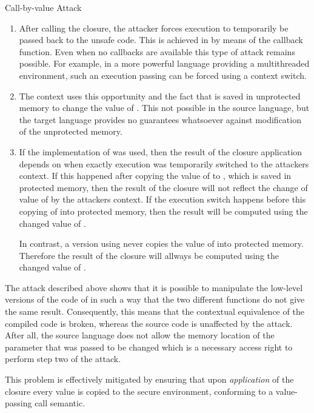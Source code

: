 \documentclass[10pt,a4paper,master=cws, masteroption=ai,english,inputenc=utf8]{kulemt}
\begin{document}
\begin{attack}{Call-by-value Attack}
\begin{enumerate}
\item After calling the closure, the attacker forces execution to temporarily be passed back to the unsafe code.
This is achieved in  by means of the callback function. 
Even when no callbacks are available this type of attack remains possible. For example, in a more powerful language providing a multithreaded environment, such an execution passing can be forced using a context switch.
\item The context uses this opportunity and the fact that  is saved in unprotected memory to change the value of . This not possible in the source language, but the target language provides no guarantees whatsoever against modification of the unprotected memory.
\item If the implementation of  was used, then the result of the closure application depends on when exactly execution was temporarily switched to the attackers context.
If this happened after copying the value of  to , which is saved in protected memory, then the result of the closure will not reflect the change of value of  by the attackers context.
If the execution switch happens before this copying of  into protected memory, then the result will be computed using the changed value of .

In contrast, a version using   never copies the value of  into protected memory. 
Therefore the result of the closure will allways be computed using the changed value of .
\end{enumerate}
\end{attack}


The attack described above shows that it is possible to manipulate the low-level versions of the code of  in such a way that the two different functions do not give the same result. 
Consequently, this means that the contextual equivalence of the compiled code is broken, whereas the source code is unaffected by the attack.
After all, the source language does not allow the memory location of the parameter that was passed to be changed which is a necessary access right to perform step two of the attack.

This problem is effectively mitigated by ensuring that upon \emph{application} of the closure every value is copied to the secure environment, conforming to a value-passing call semantic.
\end{document}
